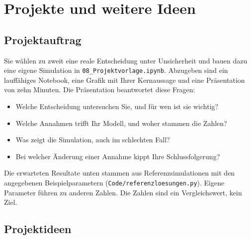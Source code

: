 \chapter{Projekte und weitere Ideen}


\section{Projektauftrag}
Sie wählen zu zweit eine reale Entscheidung unter Unsicherheit und bauen dazu eine eigene Simulation in \texttt{08\_Projektvorlage.ipynb}. Abzugeben sind ein lauffähiges Notebook, eine Grafik mit Ihrer Kernaussage und eine Präsentation von zehn Minuten. Die Präsentation beantwortet diese Fragen:
\begin{itemize}
	\item Welche Entscheidung untersuchen Sie, und für wen ist sie wichtig?
	\item Welche Annahmen trifft Ihr Modell, und woher stammen die Zahlen?
	\item Was zeigt die Simulation, auch im schlechten Fall?
	\item Bei welcher Änderung einer Annahme kippt Ihre Schlussfolgerung?
\end{itemize}

Die erwarteten Resultate unten stammen aus Referenzsimulationen mit den angegebenen Beispielparametern (\texttt{Code/referenzloesungen.py}). Eigene Parameter führen zu anderen Zahlen. Die Zahlen sind ein Vergleichswert, kein Ziel.

\newcommand{\projekt}[6]{%
	\subsection{#1}
	\begin{description}[leftmargin=!,labelwidth=2.6cm,topsep=2pt,itemsep=2pt]
		\item[Leitfrage] #2
		\item[Produkt] #3
		\item[Hilfestellung] #4
		\item[Erwartet] #5
		\item[Quellen] #6
	\end{description}}

\section{Projektideen}

